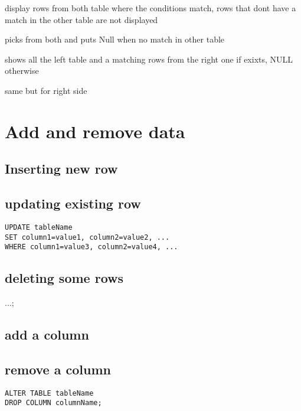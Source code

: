 			 display rows from both table where the conditions match, rows that dont have a match in the other table are not displayed

			 picks from both and puts Null when no match in other table

			 shows all the left table and a matching rows from the right one if exixts, NULL otherwise

			 same but for right side


\section{Add and remove data}

	\subsection{Inserting new row}


	\subsection{updating existing row}

\begin{lstlisting}
UPDATE tableName
SET column1=value1, column2=value2, ...
WHERE column1=value3, column2=value4, ...
\end{lstlisting}

	\subsection{deleting some rows}

		...;

\subsection{add a column}
	

	\subsection{remove a column}

\begin{lstlisting}
ALTER TABLE tableName
DROP COLUMN columnName;
\end{lstlisting}


